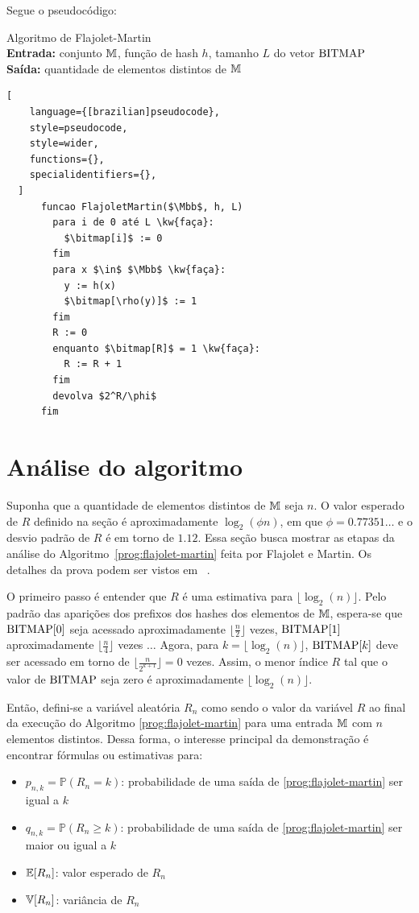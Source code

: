 Segue o pseudocódigo:
\begin{programruledcaption}{
Algoritmo de Flajolet-Martin 
\\ \textbf{Entrada:} conjunto $\mathbb{M}$, função de hash $h$, tamanho $L$ do vetor $\text{BITMAP}$ 
\\ \textbf{Saída:} quantidade de elementos distintos de $\mathbb{M}$
\label{prog:flajolet-martin}
}
  \begin{lstlisting}[
    language={[brazilian]pseudocode},
    style=pseudocode,
    style=wider,
    functions={},
    specialidentifiers={},
  ]
      funcao FlajoletMartin($\Mbb$, h, L)
        para i de 0 até L \kw{faça}:
          $\bitmap[i]$ := 0
        fim
        para x $\in$ $\Mbb$ \kw{faça}:
          y := h(x)
          $\bitmap[\rho(y)]$ := 1
        fim
        R := 0
        enquanto $\bitmap[R]$ = 1 \kw{faça}:
          R := R + 1
        fim
        devolva $2^R/\phi$
      fim
  \end{lstlisting}
\end{programruledcaption}

\section{Análise do algoritmo}
\label{sec:flajolet-martin:analysis}

Suponha que a quantidade de elementos distintos de $\mathbb{M}$ seja $n$. O valor esperado de $R$ definido na seção 
 é aproximadamente $\log_2(\phi n)$, em que $\phi = 0.77351\dots$ e o desvio padrão 
de $R$ é em torno de $1.12$. Essa seção busca mostrar as etapas da análise do Algoritmo~\ref{prog:flajolet-martin} feita 
por Flajolet e Martin. Os detalhes da prova podem ser vistos em ~\citep{flajolet:martin:85}.

O primeiro passo é entender que $R$ é uma estimativa para $\lfloor \log_2(n) \rfloor$. Pelo padrão das aparições dos 
prefixos dos hashes dos elementos de $\mathbb{M}$, espera-se que $\text{BITMAP}[0]$ seja acessado aproximadamente $\lfloor 
\frac{n}{2} \rfloor$ vezes, $\text{BITMAP}[1]$ aproximadamente $\lfloor \frac{n}{4} \rfloor$ vezes $\dots$ Agora, para 
$k = \lfloor \log_2(n) \rfloor$, $\text{BITMAP}[k]$ deve ser acessado em torno de $\lfloor \frac{n}{2^{k+1}} \rfloor = 0$ 
vezes. Assim, o menor índice $R$ tal que o valor de $\text{BITMAP}$ seja zero é aproximadamente $\lfloor \log_2(n) \rfloor$.

Então, defini-se a variável aleatória $R_n$ como sendo o valor da variável $R$ ao final da execução do Algoritmo 
\ref{prog:flajolet-martin} para uma entrada $\mathbb{M}$ com $n$ elementos distintos. Dessa forma, o interesse principal 
da demonstração é encontrar fórmulas ou estimativas para:
\begin{itemize}
  \item $p_{n,k} = \mathbb{P}(R_n = k)$: probabilidade de uma saída de \ref{prog:flajolet-martin} ser igual a $k$
  \item $q_{n,k} = \mathbb{P}(R_n \geq k)$: probabilidade de uma saída de \ref{prog:flajolet-martin} 
  ser maior ou igual a $k$
  \item $\mathbb{E}[R_n]$: valor esperado de $R_n$
  \item $\mathbb{V}[R_n]$: variância de $R_n$
\end{itemize}

